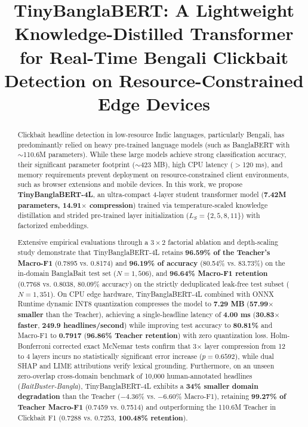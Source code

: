 \documentclass[conference]{IEEEtran}
\begin{document}
\title{TinyBanglaBERT: A Lightweight Knowledge-Distilled Transformer for Real-Time Bengali Clickbait Detection on Resource-Constrained Edge Devices}

\author{
}

\maketitle

\begin{abstract}
Clickbait headline detection in low-resource Indic languages, particularly Bengali, has predominantly relied on heavy pre-trained language models (such as BanglaBERT with $\sim$110.6M parameters). While these large models achieve strong classification accuracy, their significant parameter footprint ($\sim$423 MB), high CPU latency ($>$120 ms), and memory requirements prevent deployment on resource-constrained client environments, such as browser extensions and mobile devices. In this work, we propose \textbf{TinyBanglaBERT-4L}, an ultra-compact 4-layer student transformer model (\textbf{7.42M parameters, 14.91$\times$ compression}) trained via temperature-scaled knowledge distillation and strided pre-trained layer initialization ($L_S = \{2, 5, 8, 11\}$) with factorized embeddings.

Extensive empirical evaluations through a $3 \times 2$ factorial ablation and depth-scaling study demonstrate that TinyBanglaBERT-4L retains \textbf{96.59\% of the Teacher's Macro-F1} (0.7895 vs. 0.8174) and \textbf{96.19\% of accuracy} (80.54\% vs. 83.73\%) on the in-domain BanglaBait test set ($N = 1,506$), and \textbf{96.64\% Macro-F1 retention} (0.7768 vs. 0.8038, 80.09\% accuracy) on the strictly deduplicated leak-free test subset ($N = 1,351$). On CPU edge hardware, TinyBanglaBERT-4L combined with ONNX Runtime dynamic INT8 quantization compresses the model to \textbf{7.29 MB} (\textbf{57.99$\times$ smaller} than the Teacher), achieving a single-headline latency of \textbf{4.00 ms} (\textbf{30.83$\times$ faster}, \textbf{249.9 headlines/second}) while improving test accuracy to \textbf{80.81\%} and Macro-F1 to \textbf{0.7917} (\textbf{96.86\% Teacher retention}) with zero quantization loss. Holm-Bonferroni corrected exact McNemar tests confirm that 3$\times$ layer compression from 12 to 4 layers incurs no statistically significant error increase ($p = 0.6592$), while dual SHAP and LIME attributions verify lexical grounding. Furthermore, on an unseen zero-overlap cross-domain benchmark of 10,000 human-annotated headlines (\textit{BaitBuster-Bangla}), TinyBanglaBERT-4L exhibits a \textbf{34\% smaller domain degradation} than the Teacher ($-4.36\%$ vs. $-6.60\%$ Macro-F1), retaining \textbf{99.27\% of Teacher Macro-F1} (0.7459 vs. 0.7514) and outperforming the 110.6M Teacher in Clickbait F1 (0.7288 vs. 0.7253, \textbf{100.48\% retention}).
\end{abstract}
\end{document}
